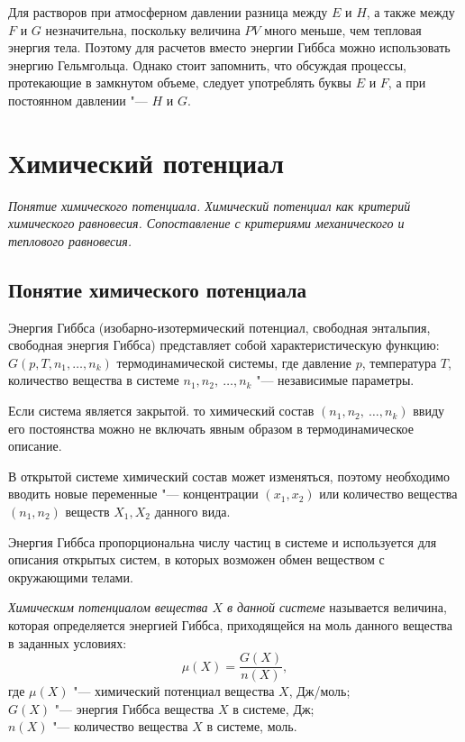 \documentclass[12pt,a4paper,oneside]{book}
\begin{document}
Для растворов при атмосферном давлении разница между $E$ и $H$, а также между $F$ и $G$ незначительна, поскольку величина $PV$ много меньше, чем тепловая энергия тела. Поэтому для расчетов вместо энергии Гиббса можно использовать энергию Гельмгольца. Однако стоит запомнить, что обсуждая процессы, протекающие в замкнутом объеме, следует употреблять буквы $E$ и $F$, а при постоянном давлении "---  $H$ и $G$.


\newpage
\section{Химический потенциал}
{\it Понятие химического потенциала. Химический потенциал как критерий химического равновесия. Сопоставление с критериями механического и теплового равновесия.}

\subsection{Понятие химического потенциала}

Энергия Гиббса (изобарно-изотермический потенциал, свободная энтальпия, свободная энергия Гиббса) представляет собой характеристическую функцию: $G(p, T, n_1, \dots, n_k)$ термодинамической системы, где давление $p$, температура $T$, количество вещества в системе $n_1, n_2,\ \dots, n_k$ "--- независимые параметры.

Если система является закрытой. то химический состав $(n_1, n_2,\ \dots, n_k)$ ввиду его постоянства можно не включать явным образом в термодинамическое описание.

В открытой системе химический состав может изменяться, поэтому необходимо вводить новые переменные "--- концентрации $(x_1, x_2)$ или количество вещества $(n_1, n_2)$ веществ $X_1, X_2$ данного вида.

Энергия Гиббса пропорциональна числу частиц в системе и используется для описания открытых систем, в которых возможен обмен веществом с окружающими телами.

{\it Химическим потенциалом вещества $X$ в данной системе} называется величина, которая определяется энергией Гиббса, приходящейся на моль данного вещества в заданных условиях:
\begin{equation}
	\mu(X)=\frac{G(X)}{n(X)},
\end{equation}
где $\mu(X)$ "--- химический потенциал вещества $X$, Дж/моль;\\
$G(X)$ "--- энергия Гиббса вещества $X$ в системе, Дж;\\
$n(X)$ "--- количество вещества $X$ в системе, моль.
\end{document}
